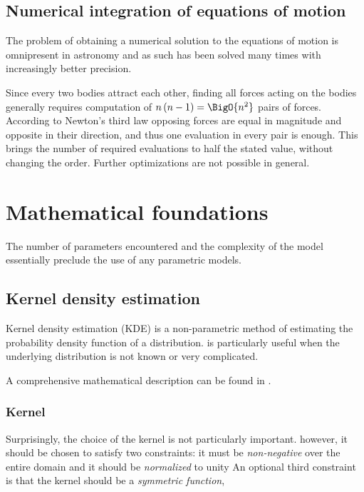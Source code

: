     \subsection{Numerical integration of equations of motion} \label{msi}
        The problem of obtaining a numerical solution to the equations of motion is omnipresent
        in astronomy and as such has been solved many times with increasingly better precision.

        Since every two bodies attract each other, finding all forces acting on the bodies generally
        requires computation of $n\left(n - 1\right) = \BigO{n^2}$ pairs of forces.
        According to Newton's third law opposing forces are equal in magnitude and opposite in their direction,
        and thus one evaluation in every pair is enough.
        This brings the number of required evaluations to half the stated value, without changing the order.
        Further optimizations are not possible in general.

\section{Mathematical foundations} \label{mm}

    The number of parameters encountered and the complexity of the model essentially preclude the use of any parametric models.

    \subsection{Kernel density estimation} \label{mmk}
        Kernel density estimation (KDE) is a non-parametric method of estimating the probability density function
        of a distribution.
        is particularly useful when the underlying distribution is not known or very complicated.

        A comprehensive mathematical description can be found in \citep{hwang+1994}.

        \subsubsection{Kernel} \label{mmkk}
            Surprisingly, the choice of the kernel is not particularly important.
            however, it should be chosen to satisfy two constraints: it must be
            \emph{non-negative} over the entire domain
            and it should be \emph{normalized} to unity
            An optional third constraint is that the kernel should be a \emph{symmetric function},

